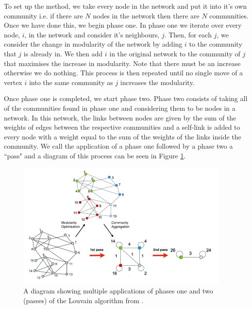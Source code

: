 To set up the method, we take every node in the network and put it into it's own community i.e. if there are $N$ nodes in the network then there are $N$ communities. Once we have done this, we begin phase one. In phase one we iterate over every node, $i$, in the network and consider it's neighbours, $j$. Then, for each $j$, we consider the change in modularity of the network by adding $i$ to the community that $j$ is already in. We then add $i$ in the original network to the community of $j$ that maximises the increase in modularity. Note that there must be an increase otherwise we do nothing. This process is then repeated until no single move of a vertex $i$ into the same community as $j$ increases the modularity.

Once phase one is completed, we start phase two. Phase two consists of taking all of the communities found in phase one and considering them to be nodes in a network. In this network, the links between nodes are given by the sum of the weights of edges between the respective communities and a self-link is added to every node with a weight equal to the sum of the weights of the links inside the community. We call the application of a phase one followed by a phase two a ``pass" and a diagram of this process can be seen in Figure \ref{fig:louvain_aggregation_diagram}.

\begin{figure}
    \begin{center}
        \includegraphics[width=0.95\textwidth]{img/3/louvain}
    \end{center}
    \caption{A diagram showing multiple applications of phases one and two (passes) of the Louvain algorithm from \cite{Blondel_2008}.}
    \label{fig:louvain_aggregation_diagram}
\end{figure}

